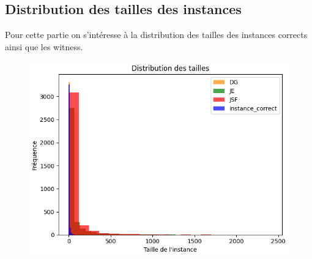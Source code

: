       \subsection{Distribution des tailles des instances}
        Pour cette partie on s'intéresse à la distribution des tailles des instances corrects ainsi que les witness. 
        \begin{figure}[H]
          \centering
          \includegraphics[scale=0.7]{Photos/ted_vs_errors/distribution_tailles.PNG}
        \end{figure}

